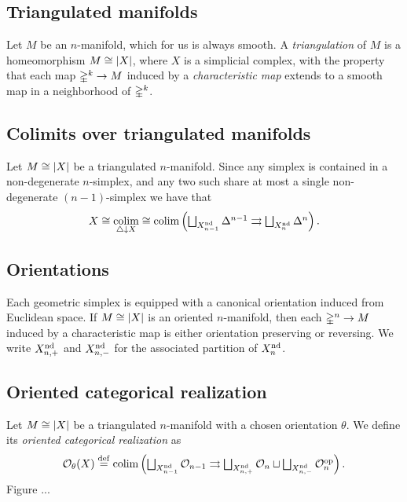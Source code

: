 \subsection{Triangulated manifolds}

Let $M$ be an $n$-manifold, which for us is always smooth.
A \textit{triangulation} of $M$ is a homeomorphism $M \cong \lvert X\rvert$, where $X$ is a simplicial complex, with the property that each map $\mathbb{\Delta}^k \to M$ induced by a \textit{characteristic map} extends to a smooth map in a neighborhood of $\mathbb{\Delta}^k$.

\subsection{Colimits over triangulated manifolds}

Let $M \cong \lvert X\rvert$ be a triangulated $n$-manifold.
Since any simplex is contained in a non-degenerate $n$-simplex, and any two such share at most a single non-degenerate $(n-1)$-simplex we have that
\[
X \cong \operatorname*{colim}_{\triangle \downarrow X}
  \cong \textstyle \operatorname*{colim} \left(\bigsqcup_{X_{n-1}^{\mathrm{nd}}} \Delta^{n-1} \rightrightarrows \bigsqcup_{X_n^{\mathrm{nd}}} \Delta^n \right).
\]

\subsection{Orientations}

Each geometric simplex is equipped with a canonical orientation induced from Euclidean space.
If $M \cong \lvert X\rvert$ is an oriented $n$-manifold, then each $\mathbb{\Delta}^n \to M$ induced by a characteristic map is either orientation preserving or reversing.
We write $X_{n,+}^{\mathrm{nd}}$ and $X_{n,-}^{\mathrm{nd}}$ for the associated partition of $X_n^{\mathrm{nd}}$.

\subsection{Oriented categorical realization}

Let $M \cong \lvert X\rvert$ be a triangulated $n$-manifold with a chosen orientation $\theta$.
We define its \textit{oriented categorical realization} as
\[
\mathcal{O}_\theta(X) \stackrel{\mathrm{def}}{=}
\textstyle \operatorname*{colim} \left(\bigsqcup_{X_{n-1}^{\mathrm{nd}}} \mathcal{O}_{n-1} \rightrightarrows \bigsqcup_{X_{n,+}^{\mathrm{nd}}} \mathcal{O}_n \sqcup \bigsqcup_{X_{n,-}^{\mathrm{nd}}} \mathcal{O}_n^{\mathrm{op}} \right).
\]
Figure ...